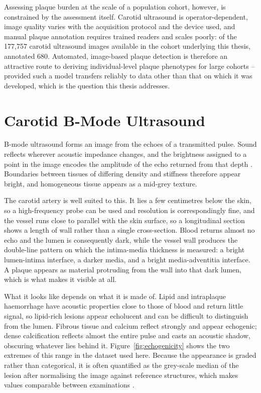 Assessing plaque burden at the scale of a population cohort, however, is
constrained by the assessment itself. Carotid ultrasound is operator-dependent,
image quality varies with the acquisition protocol and the device used, and
manual plaque annotation requires trained readers and scales poorly: of the
177{,}757 carotid ultrasound images available in the cohort underlying this
thesis, \textcite{omarov2024deep} annotated 680. Automated, image-based
plaque detection is therefore an attractive route to deriving individual-level
plaque phenotypes for large cohorts -- provided such a model transfers reliably
to data other than that on which it was developed, which is the question this
thesis addresses.

\section{Carotid B-Mode Ultrasound}
\label{sec:ultrasound}

B-mode ultrasound forms an image from the echoes of a transmitted pulse. Sound reflects wherever
acoustic impedance changes, and the brightness assigned to a point in the image encodes the
amplitude of the echo returned from that depth \cite{bakhru2013ultrasound}. Boundaries between
tissues of differing density and stiffness therefore appear bright, and homogeneous tissue
appears as a mid-grey texture.

The carotid artery is well suited to this. It lies a few centimetres below the skin, so a
high-frequency probe can be used and resolution is correspondingly fine, and the vessel runs
close to parallel with the skin surface, so a longitudinal section shows a length of wall rather
than a single cross-section. Blood returns almost no echo and the lumen is consequently dark,
while the vessel wall produces the double-line pattern on which the intima-media thickness is
measured: a bright lumen-intima interface, a darker media, and a bright media-adventitia
interface. A plaque appears as material protruding from the wall into that dark lumen, which is
what makes it visible at all.

What it looks like depends on what it is made of. Lipid and intraplaque haemorrhage have acoustic
properties close to those of blood and return little signal, so lipid-rich lesions appear
echolucent and can be difficult to distinguish from the lumen. Fibrous tissue and calcium reflect
strongly and appear echogenic; dense calcification reflects almost the entire pulse and casts an
acoustic shadow, obscuring whatever lies behind it. Figure~\ref{fig:echogenicity} shows the two
extremes of this range in the dataset used here. Because the appearance is graded rather than
categorical, it is often quantified as the grey-scale median of the lesion after normalising the
image against reference structures, which makes values comparable between examinations
\cite{plonski2024gsm}.


